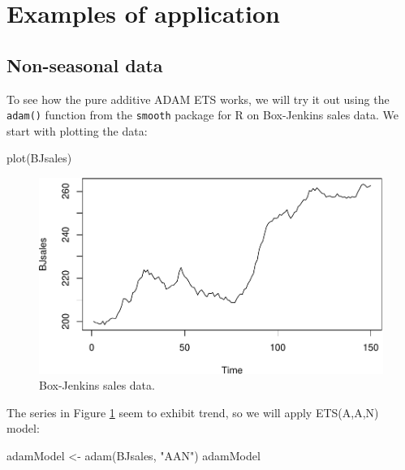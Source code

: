 \documentclass[
]{book}
\newenvironment{Shaded}{\begin{snugshade}}{\end{snugshade}}
\newcommand{\FunctionTok}[1]{\textcolor[rgb]{0.00,0.00,0.00}{#1}}
\newcommand{\NormalTok}[1]{#1}
\newcommand{\OtherTok}[1]{\textcolor[rgb]{0.56,0.35,0.01}{#1}}
\newcommand{\StringTok}[1]{\textcolor[rgb]{0.31,0.60,0.02}{#1}}
\theoremstyle{definition}
\theoremstyle{definition}
\theoremstyle{definition}
\theoremstyle{definition}
\theoremstyle{remark}
\begin{document}
\hypertarget{ADAMETSPureAdditiveExamples}{%
\section{Examples of application}\label{ADAMETSPureAdditiveExamples}}

\hypertarget{non-seasonal-data}{%
\subsection{Non-seasonal data}\label{non-seasonal-data}}

To see how the pure additive ADAM ETS works, we will try it out using the \texttt{adam()} function from the \texttt{smooth} package for R on Box-Jenkins sales data. We start with plotting the data:

\begin{Shaded}
\begin{Highlighting}[]
\FunctionTok{plot}\NormalTok{(BJsales)}
\end{Highlighting}
\end{Shaded}

\begin{figure}
\centering
\includegraphics{Svetunkov--2022----ADAM_files/figure-latex/BJsalesDataPlot-1.pdf}
\caption{\label{fig:BJsalesDataPlot}Box-Jenkins sales data.}
\end{figure}

The series in Figure \ref{fig:BJsalesDataPlot} seem to exhibit trend, so we will apply ETS(A,A,N) model:

\begin{Shaded}
\begin{Highlighting}[]
\NormalTok{adamModel }\OtherTok{\textless{}{-}} \FunctionTok{adam}\NormalTok{(BJsales, }\StringTok{"AAN"}\NormalTok{)}
\NormalTok{adamModel}
\end{Highlighting}
\end{Shaded}
\end{document}
